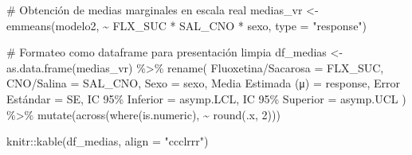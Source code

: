\documentclass[
  letterpaper,
  DIV=11,
  numbers=noendperiod]{scrartcl}
\newenvironment{Shaded}{\begin{snugshade}}{\end{snugshade}}
\newcommand{\AttributeTok}[1]{\textcolor[rgb]{0.40,0.45,0.13}{#1}}
\newcommand{\CommentTok}[1]{\textcolor[rgb]{0.37,0.37,0.37}{#1}}
\newcommand{\DecValTok}[1]{\textcolor[rgb]{0.68,0.00,0.00}{#1}}
\newcommand{\FunctionTok}[1]{\textcolor[rgb]{0.28,0.35,0.67}{#1}}
\newcommand{\NormalTok}[1]{\textcolor[rgb]{0.00,0.23,0.31}{#1}}
\newcommand{\OtherTok}[1]{\textcolor[rgb]{0.00,0.23,0.31}{#1}}
\newcommand{\SpecialCharTok}[1]{\textcolor[rgb]{0.37,0.37,0.37}{#1}}
\newcommand{\StringTok}[1]{\textcolor[rgb]{0.13,0.47,0.30}{#1}}
\begin{document}
\begin{Shaded}
\begin{Highlighting}[]
\CommentTok{\# Obtención de medias marginales en escala real}
\NormalTok{medias\_vr }\OtherTok{\textless{}{-}} \FunctionTok{emmeans}\NormalTok{(modelo2, }\SpecialCharTok{\textasciitilde{}}\NormalTok{ FLX\_SUC }\SpecialCharTok{*}\NormalTok{ SAL\_CNO }\SpecialCharTok{*}\NormalTok{ sexo, }\AttributeTok{type =} \StringTok{"response"}\NormalTok{)}

\CommentTok{\# Formateo como dataframe para presentación limpia}
\NormalTok{df\_medias }\OtherTok{\textless{}{-}} \FunctionTok{as.data.frame}\NormalTok{(medias\_vr) }\SpecialCharTok{\%\textgreater{}\%}
  \FunctionTok{rename}\NormalTok{(}
    \StringTok{\textasciigrave{}}\AttributeTok{Fluoxetina/Sacarosa}\StringTok{\textasciigrave{}} \OtherTok{=}\NormalTok{ FLX\_SUC,}
    \StringTok{\textasciigrave{}}\AttributeTok{CNO/Salina}\StringTok{\textasciigrave{}} \OtherTok{=}\NormalTok{ SAL\_CNO,}
    \AttributeTok{Sexo =}\NormalTok{ sexo,}
    \StringTok{\textasciigrave{}}\AttributeTok{Media Estimada (μ)}\StringTok{\textasciigrave{}} \OtherTok{=}\NormalTok{ response,}
    \StringTok{\textasciigrave{}}\AttributeTok{Error Estándar}\StringTok{\textasciigrave{}} \OtherTok{=}\NormalTok{ SE,}
    \StringTok{\textasciigrave{}}\AttributeTok{IC 95\% Inferior}\StringTok{\textasciigrave{}} \OtherTok{=}\NormalTok{ asymp.LCL,}
    \StringTok{\textasciigrave{}}\AttributeTok{IC 95\% Superior}\StringTok{\textasciigrave{}} \OtherTok{=}\NormalTok{ asymp.UCL}
\NormalTok{  ) }\SpecialCharTok{\%\textgreater{}\%}
  \FunctionTok{mutate}\NormalTok{(}\FunctionTok{across}\NormalTok{(}\FunctionTok{where}\NormalTok{(is.numeric), }\SpecialCharTok{\textasciitilde{}} \FunctionTok{round}\NormalTok{(.x, }\DecValTok{2}\NormalTok{)))}

\NormalTok{knitr}\SpecialCharTok{::}\FunctionTok{kable}\NormalTok{(df\_medias, }\AttributeTok{align =} \StringTok{"ccclrrr"}\NormalTok{)}
\end{Highlighting}
\end{Shaded}
\end{document}
